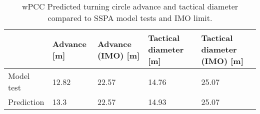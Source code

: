 \begin{table}[!htb]
    \footnotesize
    \caption{wPCC Predicted turning circle advance and tactical diameter compared to SSPA model tests and IMO limit.}
    \label{\detokenize{06.10_results_wpcc:tab-wpcc-advance}}
    \centering
    \begin{tabular*}{\textwidth}{p{2cm} p{1.5cm} p{1.5cm} p{2.5cm} p{2.5cm}}
\toprule
&

Advance {[}m{]}
&

Advance (IMO) {[}m{]}
&

Tactical diameter {[}m{]}
&

Tactical diameter (IMO) {[}m{]}
\\
\hline

Model test
&

12.82
&

22.57
&

14.76
&

25.07
\\

Prediction
&

13.3
&

22.57
&

14.93
&

25.07
\\
\bottomrule
\end{tabular*}

\end{table}

